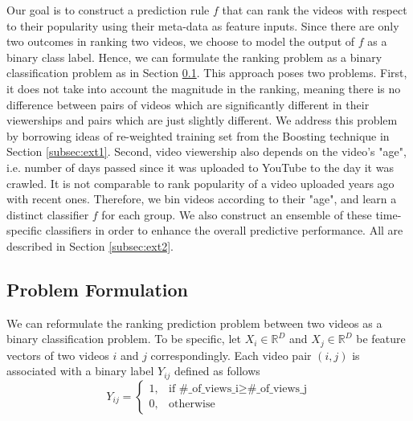 Our goal is to construct a prediction rule $f$ that can rank the videos with respect to their popularity using their meta-data as feature inputs. Since there are only two outcomes in ranking two videos, we choose to model the output of $f$ as a binary class label. Hence, we can formulate the ranking problem as a binary classification problem as in Section \ref{subsec:probFormulation}. This approach poses two problems. First, it does not take into account the magnitude in the ranking, meaning there is no difference between pairs of videos which are significantly different in their viewerships and pairs which are just slightly different. We address this problem by borrowing ideas of re-weighted training set from the Boosting technique in Section \ref{subsec:ext1}. Second, video viewership also depends on the video's "age", i.e. number of days passed since it was uploaded to YouTube to the day it was crawled. It is not comparable to rank popularity of a video uploaded years ago with recent ones. Therefore, we bin videos according to their "age", and learn a distinct classifier $f$ for each group. We also construct an ensemble of these time-specific classifiers in order to enhance the overall predictive performance. All are described in Section \ref{subsec:ext2}.

\subsection{Problem Formulation}
\label{subsec:probFormulation}
	We can reformulate the ranking prediction problem between two videos as a binary classification problem. To be specific, let $X_i \in \mathbb{R}^D$ and $X_j \in \mathbb{R}^D$ be feature vectors of two videos $i$ and $j$ correspondingly. Each video pair $(i, j)$ is associated with a binary label $Y_{ij}$ defined as follows
		\begin{equation}
		Y_{ij} = \begin{cases}
				   1, & \text{if } \text{\#\_of\_views\_i} \geq \text{\#\_of\_views\_j} \\
				   0, & \text{otherwise}
				\end{cases} 
		\label{eqn:binaryLabel}			
		\end{equation}	

